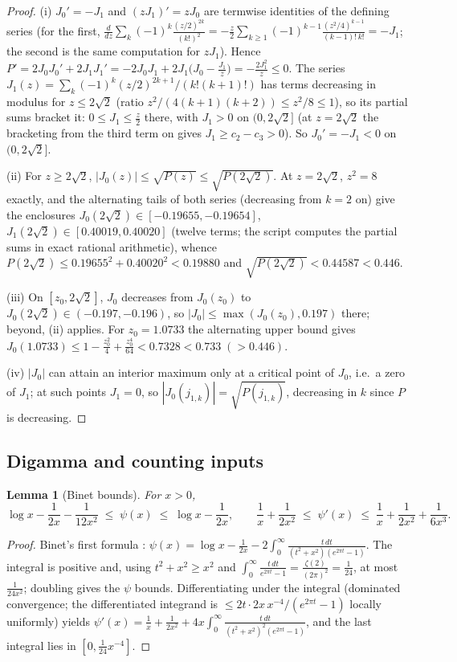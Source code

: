\documentclass[11pt]{article}
\newtheorem{lemma}{Lemma}
\begin{document}
\begin{proof}
(i) $J_0'=-J_1$ and $(zJ_1)'=zJ_0$ are termwise identities of the
defining series (for the first,
$\frac{d}{dz}\sum_k(-1)^k\frac{(z/2)^{2k}}{(k!)^2}
=-\frac z2\sum_{k\ge1}(-1)^{k-1}\frac{(z^2/4)^{k-1}}{(k-1)!\,k!}
=-J_1$; the second is the same computation for $zJ_1$). Hence
$P'=2J_0J_0'+2J_1J_1'=-2J_0J_1+2J_1\bigl(J_0-\tfrac{J_1}z\bigr)
=-\tfrac{2J_1^2}z\le0$. The series
$J_1(z)=\sum_k(-1)^k(z/2)^{2k+1}/(k!(k+1)!)$ has terms decreasing in
modulus for $z\le2\sqrt2$ (ratio $z^2/(4(k+1)(k+2))\le z^2/8\le1$),
so its partial sums bracket it: $0\le J_1\le\tfrac z2$ there, with
$J_1>0$ on $(0,2\sqrt2]$ (at $z=2\sqrt2$ the bracketing from the
third term on gives $J_1\ge c_2-c_3>0$). So $J_0'=-J_1<0$ on
$(0,2\sqrt2]$.

(ii) For $z\ge2\sqrt2$, $|J_0(z)|\le\sqrt{P(z)}\le\sqrt{P(2\sqrt2)}$.
At $z=2\sqrt2$, $z^2=8$ exactly, and the alternating tails of both
series (decreasing from $k=2$ on) give the enclosures
$J_0(2\sqrt2)\in[-0.19655,-0.19654]$,
$J_1(2\sqrt2)\in[0.40019,0.40020]$ (twelve terms; the script computes
the partial sums in exact rational arithmetic), whence
$P(2\sqrt2)\le0.19655^2+0.40020^2<0.19880$ and
$\sqrt{P(2\sqrt2)}<0.44587<0.446$.

(iii) On $[z_0,2\sqrt2]$, $J_0$ decreases from $J_0(z_0)$ to
$J_0(2\sqrt2)\in(-0.197,-0.196)$, so $|J_0|\le\max(J_0(z_0),0.197)$
there; beyond, (ii) applies. For $z_0=1.0733$ the alternating upper
bound gives $J_0(1.0733)\le1-\tfrac{z_0^2}4+\tfrac{z_0^4}{64}
<0.7328<0.733\;(>0.446)$.

(iv) $|J_0|$ can attain an interior maximum only at a critical point
of $J_0$, i.e.\ a zero of $J_1$; at such points $J_1=0$, so
$|J_0(j_{1,k})|=\sqrt{P(j_{1,k})}$, decreasing in $k$ since $P$ is
decreasing.
\end{proof}

\subsection*{Digamma and counting inputs}

\begin{lemma}[Binet bounds]\label{lem:binet}
For $x>0$,
\[
\log x-\frac1{2x}-\frac1{12x^2}\;\le\;\psi(x)\;\le\;\log x-\frac1{2x},
\qquad
\frac1x+\frac1{2x^2}\;\le\;\psi'(x)\;\le\;\frac1x+\frac1{2x^2}
+\frac1{6x^3}.
\]
\end{lemma}

\begin{proof}
Binet's first formula \cite[Ch.~XII]{WW27}:
$\psi(x)=\log x-\tfrac1{2x}-2\int_0^\infty
\frac{t\,dt}{(t^2+x^2)(e^{2\pi t}-1)}$. The integral is positive and,
using $t^2+x^2\ge x^2$ and
$\int_0^\infty\frac{t\,dt}{e^{2\pi t}-1}
=\frac{\zeta(2)}{(2\pi)^2}=\frac1{24}$, at most $\frac1{24x^2}$;
doubling gives the $\psi$ bounds. Differentiating under the integral
(dominated convergence; the differentiated integrand is
$\le2t\cdot2x\,x^{-4}/(e^{2\pi t}-1)$ locally uniformly) yields
$\psi'(x)=\frac1x+\frac1{2x^2}+4x\int_0^\infty
\frac{t\,dt}{(t^2+x^2)^2(e^{2\pi t}-1)}$, and the last integral lies
in $[0,\tfrac1{24}x^{-4}]$.
\end{proof}
\end{document}
